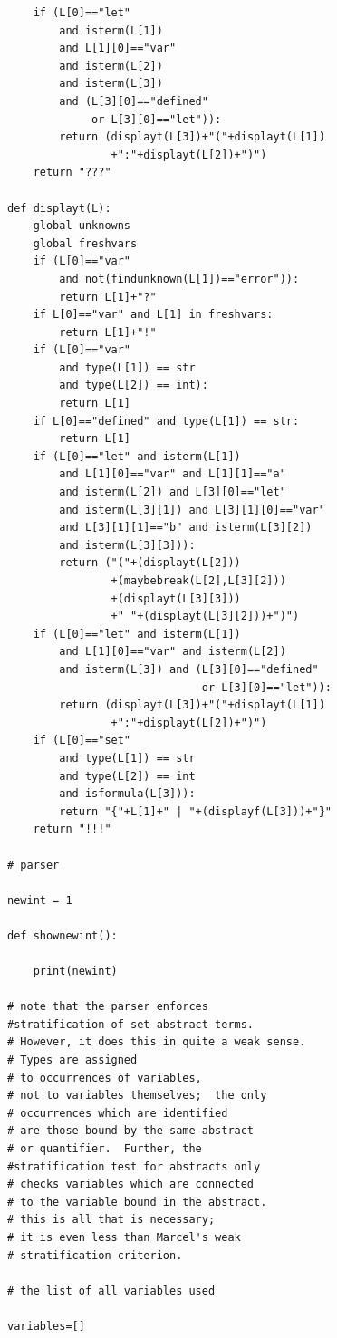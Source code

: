 \documentclass{article}
\begin{document}
\begin{verbatim}
    if (L[0]=="let"
        and isterm(L[1])
        and L[1][0]=="var"
        and isterm(L[2])
        and isterm(L[3])
        and (L[3][0]=="defined"
             or L[3][0]=="let")):
        return (displayt(L[3])+"("+displayt(L[1])
                +":"+displayt(L[2])+")")
    return "???"

def displayt(L):
    global unknowns
    global freshvars
    if (L[0]=="var"
        and not(findunknown(L[1])=="error")):
        return L[1]+"?"
    if L[0]=="var" and L[1] in freshvars:
        return L[1]+"!"
    if (L[0]=="var"
        and type(L[1]) == str
        and type(L[2]) == int):
        return L[1]
    if L[0]=="defined" and type(L[1]) == str:
        return L[1]
    if (L[0]=="let" and isterm(L[1])
        and L[1][0]=="var" and L[1][1]=="a"
        and isterm(L[2]) and L[3][0]=="let"
        and isterm(L[3][1]) and L[3][1][0]=="var"
        and L[3][1][1]=="b" and isterm(L[3][2])
        and isterm(L[3][3])):
        return ("("+(displayt(L[2]))
                +(maybebreak(L[2],L[3][2]))
                +(displayt(L[3][3]))
                +" "+(displayt(L[3][2]))+")")
    if (L[0]=="let" and isterm(L[1])
        and L[1][0]=="var" and isterm(L[2])
        and isterm(L[3]) and (L[3][0]=="defined"
                              or L[3][0]=="let")):
        return (displayt(L[3])+"("+displayt(L[1])
                +":"+displayt(L[2])+")")
    if (L[0]=="set"
        and type(L[1]) == str
        and type(L[2]) == int
        and isformula(L[3])):
        return "{"+L[1]+" | "+(displayf(L[3]))+"}"
    return "!!!"
                                                                                                 
# parser

newint = 1

def shownewint():

    print(newint)

# note that the parser enforces
#stratification of set abstract terms.
# However, it does this in quite a weak sense.
# Types are assigned
# to occurrences of variables,
# not to variables themselves;  the only
# occurrences which are identified
# are those bound by the same abstract
# or quantifier.  Further, the
#stratification test for abstracts only
# checks variables which are connected
# to the variable bound in the abstract.
# this is all that is necessary;
# it is even less than Marcel's weak
# stratification criterion.

# the list of all variables used

variables=[]


\end{verbatim}
\end{document}
